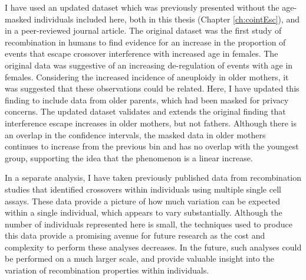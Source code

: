 I have used an updated dataset which was previously presented without the age-masked individuals included here, both in this thesis (Chapter \ref{ch:cointEsc}), and in a peer-reviewed journal article\cite{Campbell2015}.
The original dataset was the first study of recombination in humans to find evidence for an increase in the proportion of events that escape crossover interference with increased age in females.
The original data was suggestive of an increasing de-regulation of events with age in females.
Considering the increased incidence of aneuploidy in older mothers\cite{Hassold2001}, it was suggested that these observations could be related.
Here, I have updated this finding to include data from older parents, which had been masked for privacy concerns.
The updated dataset validates and extends the original finding that interference escape increases in older mothers, but not fathers.
Although there is an overlap in the confidence intervals, the masked data in older mothers continues to increase from the previous bin and has no overlap with the youngest group, supporting the idea that the phenomenon is a linear increase.

In a separate analysis, I have taken previously published data from recombination studies that identified crossovers within individuals using multiple single cell assays.
These data provide a picture of how much variation can be expected within a single individual, which appears to vary substantially.
Although the number of individuals represented here is small, the techniques used to produce this data provide a promising avenue for future research as the cost and complexity to perform these analyses decreases.
In the future, such analyses could be performed on a much larger scale, and provide valuable insight into the variation of recombination properties within individuals.

\clearpage
\renewcommand{\bibname}{References}

\begingroup
    \setlength{\bibsep}{10pt}
    \linespread{1}\selectfont
    
\endgroup



